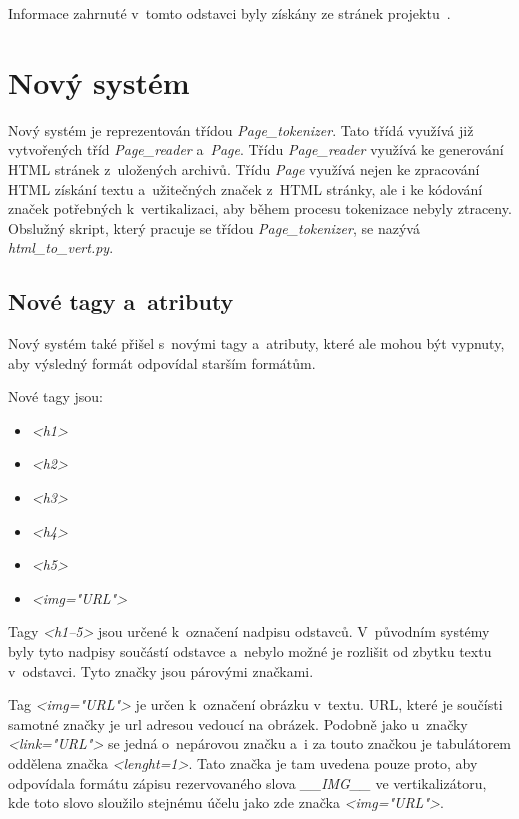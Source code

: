Informace zahrnuté v~tomto odstavci byly získány ze stránek projektu~\cite{DEDUPLIKACE}.


\section{Nový systém}
Nový systém je reprezentován třídou \textit{Page\_tokenizer}. Tato třídá využívá již vytvořených tříd
\textit{Page\_reader} a~\textit{Page}. Třídu \textit{Page\_reader} využívá ke generování HTML stránek
z~uložených archivů. Třídu \textit{Page} využívá nejen ke zpracování HTML získání textu a~užitečných značek
z~HTML stránky, ale i ke kódování značek potřebných k~vertikalizaci, aby během procesu tokenizace nebyly
ztraceny. Obslužný skript, který pracuje se třídou \textit{Page\_tokenizer}, se nazývá \textit{html\_to\_vert.py}.

\subsection{Nové tagy a~atributy}
Nový systém také přišel s~novými tagy a~atributy, které ale mohou být vypnuty, aby výsledný formát odpovídal
starším formátům.

Nové tagy jsou:
\begin{itemize}
    \item \textit{<h1>}
    \item \textit{<h2>}
    \item \textit{<h3>}
    \item \textit{<h4>}
    \item \textit{<h5>}
    \item \textit{<img="URL"\textgreater}
\end{itemize}

Tagy \textit{<h1--5>} jsou určené k~označení nadpisu odstavců. V~původním systémy byly tyto nadpisy součástí
odstavce a~nebylo možné je rozlišit od zbytku textu v~odstavci. Tyto značky jsou párovými značkami.

Tag \textit{<img="URL"\textgreater} je určen k~označení obrázku v~textu. URL, které je součísti samotné značky je url adresou
vedoucí na obrázek. Podobně jako u~značky \textit{<link="URL"\textgreater} se jedná o~nepárovou značku a~i za touto značkou
je tabulátorem oddělena značka \textit{<lenght=1>}. Tato značka je tam uvedena pouze proto, aby odpovídala
formátu zápisu rezervovaného slova \textit{\_\_IMG\_\_} ve vertikalizátoru, kde toto slovo sloužilo stejnému
účelu jako zde značka \textit{<img="URL"\textgreater}.

